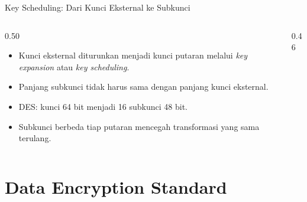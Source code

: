 \documentclass[aspectratio=169,11pt]{beamer}
\begin{document}
\begin{frame}{Key Scheduling: Dari Kunci Eksternal ke Subkunci}
    \footnotesize
    \begin{columns}[T,onlytextwidth]
        \begin{column}{0.50\textwidth}
            \begin{itemize}
                \item Kunci eksternal diturunkan menjadi kunci putaran
                      melalui \textit{key expansion} atau
                      \textit{key scheduling}.
                \item Panjang subkunci tidak harus sama dengan panjang
                      kunci eksternal.
                \item DES: kunci 64 bit menjadi 16 subkunci 48 bit.
                \item Subkunci berbeda tiap putaran mencegah transformasi
                      yang sama terulang.
            \end{itemize}
        \end{column}
        \begin{column}{0.46\textwidth}
            \begin{center}
            \end{center}
        \end{column}
    \end{columns}
\end{frame}

\section{Data Encryption Standard}
\end{document}
